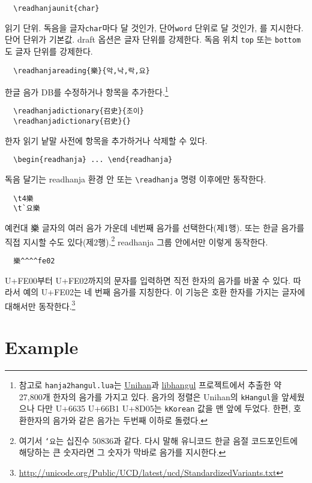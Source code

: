 \documentclass[a4paper,11pt]{article}
\begin{document}
\begin{verbatim}
  \readhanjaunit{char}
\end{verbatim}
읽기 단위. 독음을 글자\verb|char|마다 달 것인가, 단어\verb|word| 단위로
달 것인가, 를 지시한다. 단어 단위가 기본값.
draft 옵션은 글자 단위를 강제한다.
독음 위치 \verb|top| 또는 \verb|bottom|도 글자 단위를 강제한다.

\begin{verbatim}
  \readhanjareading{樂}{악,낙,락,요}
\end{verbatim}
한글 음가 DB를 수정하거나 항목을 추가한다.\footnote{참고로
  \texttt{hanja2hangul.lua}는
  \href{http://unicode.org/charts/unihan.html}{Unihan}과
  \href{https://github.com/choehwanjin/libhangul}{libhangul}
  프로젝트에서 추출한 약 27,800개 한자의 음가를
  가지고 있다. 음가의 정렬은 Unihan의 \texttt{kHangul}을 앞세웠으나
  다만 \mbox{U+6635} \mbox{U+66B1} \mbox{U+8D05}는 \texttt{kKorean} 값을
  맨 앞에 두었다. 한편, 호환한자의 음가와 같은 음가는 두번째 이하로 돌렸다.}

\begin{verbatim}
  \readhanjadictionary{召史}{조이}
  \readhanjadictionary{召史}{}
\end{verbatim}
한자 읽기 낱말 사전에 항목을 추가하거나 삭제할 수 있다.

\begin{verbatim}
  \begin{readhanja} ... \end{readhanja}
\end{verbatim}
독음 달기는 readhanja 환경 안 또는 \verb|\readhanja| 명령 이후에만 동작한다.

\begin{verbatim}
  \t4樂
  \t`요樂
\end{verbatim}
예컨대 樂 글자의 여러 음가 가운데 네번째 음가를 선택한다(제1행).
또는 한글 음가를 직접 지시할 수도 있다(제2행).\footnote{여기서 \texttt{`요}는 십진수 50836과 같다.
  다시 말해 유니코드 한글 음절 코드포인트에 해당하는 큰 숫자라면 그 숫자가 막바로 음가를 지시한다.}
readhanja 그룹 안에서만 이렇게 동작한다.

\begin{verbatim}
  樂^^^^fe02
\end{verbatim}
\mbox{U+FE00}부터 \mbox{U+FE02}까지의 문자를 입력하면 직전 한자의 음가를
바꿀 수 있다. 따라서 예의 \mbox{U+FE02}는 네 번째 음가를 지칭한다.
이 기능은 호환 한자를 가지는 글자에 대해서만 동작한다.\footnote{
\url{http://unicode.org/Public/UCD/latest/ucd/StandardizedVariants.txt}}

\section*{Example}
\end{document}

